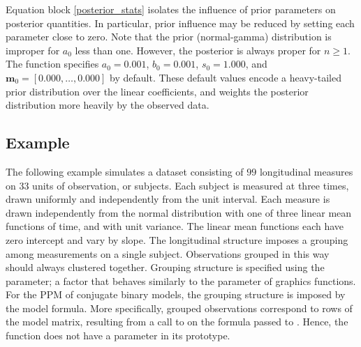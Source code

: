 \documentclass[article, nojss]{jss}
\newcommand{\bm}{\boldsymbol{m}}
\begin{document}
Equation block \ref{posterior_stats} isolates the influence of prior parameters on posterior quantities. In particular, prior influence may be reduced by setting each parameter close to zero. Note that the prior (normal-gamma) distribution is improper for $a_0$ less than one. However, the posterior is always proper for $n \geq 1$. The  function specifies $a_0 = 0.001$, $b_0 = 0.001$, $s_0 = 1.000$, and $\bm_0 = [0.000,\ldots,0.000]$ by default. These default values encode a heavy-tailed prior distribution over the linear coefficients, and weights the posterior distribution more heavily by the observed data. 

\subsection[Example]{ Example}

The following example simulates a dataset consisting of $99$ longitudinal measures on $33$ units of observation, or subjects. Each subject is measured at three times, drawn uniformly and independently from the unit interval. Each measure is drawn independently from the normal distribution with one of three linear mean functions of time, and with unit variance. The linear mean functions each have zero intercept and vary by slope. The longitudinal structure imposes a grouping among measurements on a single subject. Observations grouped in this way should always clustered together. Grouping structure is specified using the  parameter; a factor that behaves similarly to the  parameter of  graphics functions. For the PPM of conjugate binary models, the grouping structure is imposed by the model formula. More specifically, grouped observations correspond to rows of the model matrix, resulting from a call to  on the formula passed to . Hence, the  function does not have a  parameter in its prototype. 
\end{document}
